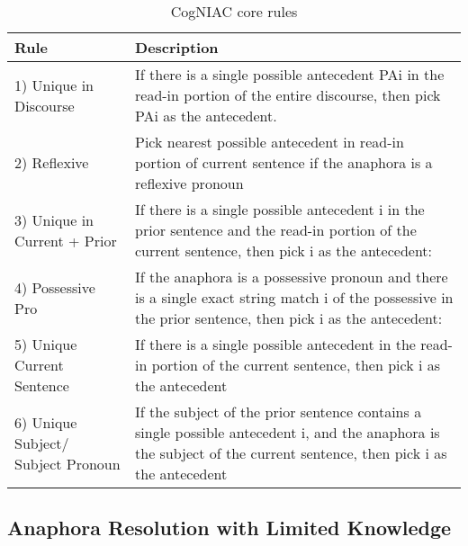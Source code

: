 \begin{table}[h]
  \caption{CogNIAC core rules}
    \begin{tabular}{| l |p{8cm} |}
    \hline
    Rule & Description \\ \hline
\hline
    1) Unique in Discourse & If there is a single possible antecedent PAi in the read-in portion of the entire discourse, then pick PAi as the antecedent. \\ \hline
    2) Reflexive & Pick nearest possible antecedent in read-in portion of current sentence if the anaphora is a reflexive pronoun \\ \hline
    3) Unique in Current + Prior & If there is a single possible antecedent i in the prior sentence and the read-in portion of the current sentence, then pick i as the antecedent: \\ \hline
    4) Possessive Pro & If the anaphora is a possessive pronoun and there is a single exact string match i of the possessive in the prior sentence, then pick i as the antecedent:  \\ \hline
    5) Unique Current Sentence & If there is a single possible antecedent in the read-in portion of the current sentence, then pick i as the antecedent  \\ \hline
    6) Unique Subject/ Subject Pronoun & If the subject of the prior sentence contains a single possible antecedent i, and the anaphora is the subject of the current sentence, then pick i as the antecedent \\ \hline
    \end{tabular}
     \label{table:cogniacRules}
\end{table}

\subsection{Anaphora Resolution with Limited Knowledge}
\label{anaphoraLimitedKnowledgeSection}

